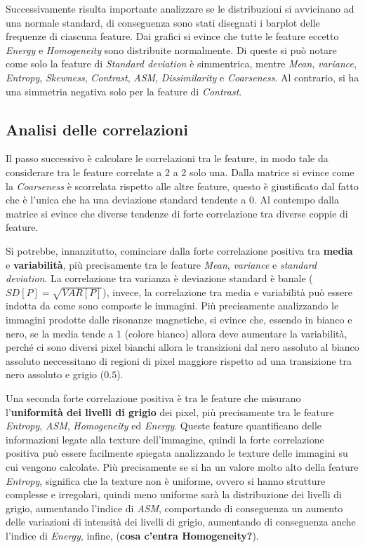 Successivamente risulta importante analizzare se le distribuzioni si avvicinano 
ad una normale standard, di conseguenza sono stati disegnati i barplot delle frequenze
di ciascuna feature. Dai grafici si evince che tutte le feature eccetto \textit{Energy} e
\textit{Homogeneity} sono distribuite normalmente. Di queste si può notare come  
solo la feature di \textit{Standard deviation} è simmentrica, mentre \textit{Mean},
\textit{variance}, \textit{Entropy}, \textit{Skewness}, \textit{Contrast}, \textit{ASM},
\textit{Dissimilarity} e \textit{Coarseness}. Al contrario, si ha una simmetria
negativa solo per la feature di \textit{Contrast}.

\subsection{Analisi delle correlazioni}
Il passo successivo è calcolare le correlazioni tra le feature, in modo tale da
considerare tra le feature correlate a 2 a 2 solo una. Dalla matrice si evince
come la \textit{Coarseness} è scorrelata rispetto alle altre feature, questo è
giustificato dal fatto che è l'unica che ha una deviazione standard tendente a 0.
Al contempo dalla matrice si evince che diverse tendenze di forte correlazione tra
diverse coppie di feature. 

Si potrebbe, innanzitutto, cominciare dalla forte correlazione positiva
tra \textbf{media} e \textbf{variabilità}, più precisamente tra le feature \textit{Mean},
\textit{variance} e \textit{standard deviation}. La correlazione tra varianza è 
deviazione standard è banale ($SD[P] = \sqrt{VAR[P]}$), invece, la correlazione tra media 
e variabilità può essere indotta da come sono composte le immagini. Più precisamente 
analizzando le immagini prodotte dalle risonanze magnetiche, si evince che, essendo in 
bianco e nero, se la media tende a $1$ (colore bianco) allora deve aumentare la 
variabilità, perché ci sono diversi pixel bianchi allora le transizioni dal nero assoluto
al bianco assoluto neccessitano di regioni di pixel maggiore rispetto ad una 
transizione tra nero assoluto e grigio ($0.5$). 

Una seconda forte correlazione positiva è 
tra le feature che misurano l'\textbf{uniformità dei livelli di grigio} dei pixel,
più precisamente tra le feature \textit{Entropy}, \textit{ASM}, \textit{Homogeneity} 
ed \textit{Energy}. Queste feature quantificano delle informazioni legate alla
texture dell'immagine, quindi la forte correlazione positiva può essere facilmente
spiegata analizzando le texture delle immagini su cui vengono calcolate. Più precisamente
se si ha un valore molto alto della feature \textit{Entropy}, significa che la
texture non è uniforme, ovvero si hanno strutture complesse e irregolari, quindi
meno uniforme sarà la distribuzione dei livelli di grigio, aumentando l'indice
di \textit{ASM}, comportando di conseguenza un aumento delle variazioni di intensità
dei livelli di grigio, aumentando di conseguenza anche l'indice di \textit{Energy},
infine, (\textbf{cosa c'entra Homogeneity?}). 

